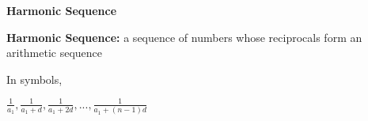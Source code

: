 \begin{center}
\textbf{Harmonic Sequence 
}
\end{center}

\textbf{Harmonic Sequence:} a sequence of numbers whose reciprocals form an arithmetic sequence 

\vspce

In symbols, 

\vspce

\begin{center}
$\displaystyle  \frac{1}{a_1},   \frac{1}{a_1 + d}, \frac{1}{a_1 + 2d},..., \frac{1}{a_1 + (n-1)d}$ 
\end{center}

